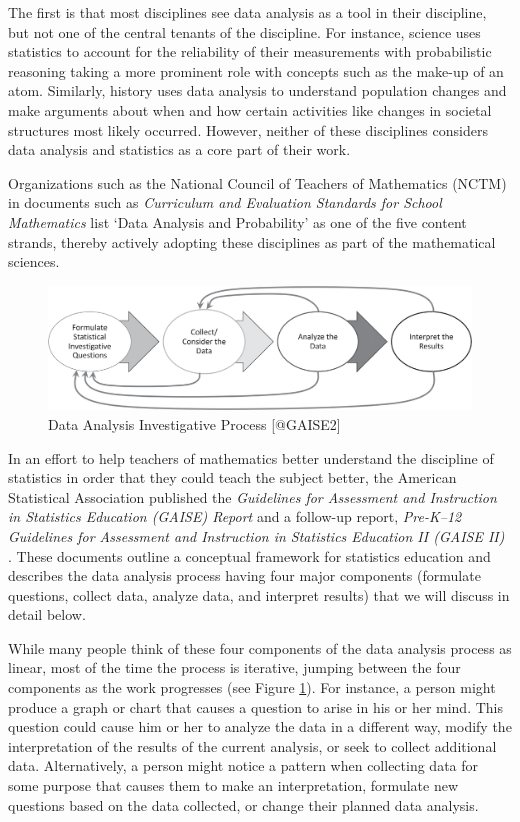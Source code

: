 \documentclass[
]{book}
\theoremstyle{definition}
\theoremstyle{definition}
\theoremstyle{definition}
\theoremstyle{definition}
\theoremstyle{remark}
\begin{document}
The first is that most disciplines see data analysis as a tool in their discipline, but not one of the central tenants of the discipline. For instance, science uses statistics to account for the reliability of their measurements with probabilistic reasoning taking a more prominent role with concepts such as the make-up of an atom. Similarly, history uses data analysis to understand population changes and make arguments about when and how certain activities like changes in societal structures most likely occurred. However, neither of these disciplines considers data analysis and statistics as a core part of their work.

Organizations such as the National Council of Teachers of Mathematics (NCTM) in documents such as \emph{Curriculum and Evaluation Standards for School Mathematics} \citep{NCTM1989} list `Data Analysis and Probability' as one of the five content strands, thereby actively adopting these disciplines as part of the mathematical sciences.

\begin{figure}

{\centering \includegraphics[width=0.9\linewidth]{tikz/GAISE3} 

}

\caption{Data Analysis Investigative Process [@GAISE2]}\label{fig:gaise-process}
\end{figure}

In an effort to help teachers of mathematics better understand the discipline of statistics in order that they could teach the subject better, the American Statistical Association published the \emph{Guidelines for Assessment and Instruction in Statistics Education (GAISE) Report} \citep{GAISE} and a follow-up report, \emph{Pre-K--12 Guidelines for Assessment and Instruction in Statistics Education II (GAISE II)} \citep{GAISE2}. These documents outline a conceptual framework for statistics education and describes the data analysis process having four major components (formulate questions, collect data, analyze data, and interpret results) that we will discuss in detail below.

While many people think of these four components of the data analysis process as linear, most of the time the process is iterative, jumping between the four components as the work progresses (see Figure \ref{fig:gaise-process}).
For instance, a person might produce a graph or chart that causes a question to arise in his or her mind. This question could cause him or her to analyze the data in a different way, modify the interpretation of the results of the current analysis, or seek to collect additional data. Alternatively, a person might notice a pattern when collecting data for some purpose that causes them to make an interpretation, formulate new questions based on the data collected, or change their planned data analysis.
\end{document}
